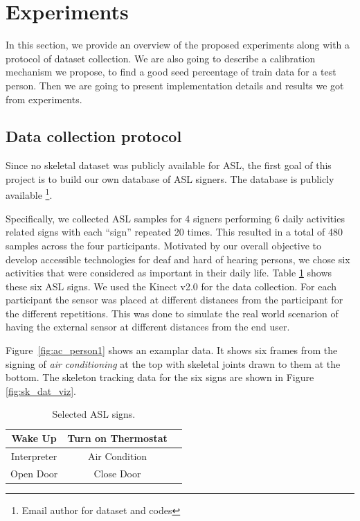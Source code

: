 \documentclass[10pt,twocolumn,letterpaper]{article}
\begin{document}
\section{Experiments}
In this section, we provide an overview of the proposed experiments along with a protocol of dataset collection. 
We are also going to describe a calibration mechanism we propose, to find a good seed
percentage of train data for a test person. Then we are going to present implementation details and results we got from experiments. 

\subsection{Data collection protocol}

Since no skeletal dataset was publicly available for
ASL, the first goal of this project is to build our own 
database of ASL signers. The database is publicly available \footnote{Email author for dataset and codes}.



Specifically, we collected  ASL samples 
for 4 signers performing 
  6 daily activities related signs with each ``sign'' repeated 20 times. This resulted in a total of 480 samples 
  across the four participants. Motivated by our overall objective to develop
  accessible technologies for deaf and hard of hearing persons, we chose 
  six activities that were considered as important in their daily life. Table \ref{table:asl_signs} 
  shows these six ASL signs. We used the Kinect v2.0 for the data collection. For each participant 
the sensor was placed at different distances from the participant for the 
different repetitions. This was done to simulate the real world scenarion of having the external sensor 
at different distances from the end user. 

Figure~\ref{fig:ac_person1} shows an examplar data. It shows six frames from the signing of 
\textit{air conditioning} at the top with 
skeletal joints drawn  to them at the bottom.  The skeleton tracking data for the six signs 
are shown in Figure \ref{fig:sk_dat_viz}.


\begin{table}[h]
	\begin{center}
		\begin{tabular}{|c|c|c}
			\hline
			Wake Up & Turn on Thermostat\\
			\hline
			Interpreter & Air Condition\\
			\hline
			Open Door & Close Door\\
			\hline
		\end{tabular}
	\end{center}
	\caption{Selected ASL signs.}
	\label{table:asl_signs}
\end{table}
\end{document}
